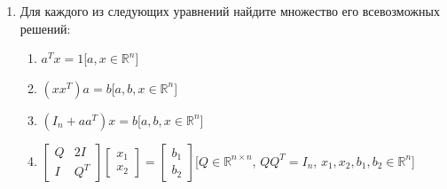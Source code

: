 \documentclass{article}
\newcommand{\R}{\mathbb{R}}
\begin{document}
\begin{enumerate}[label=\textbf{\arabic*}, leftmargin=0em]
\item Для каждого из следующих уравнений найдите множество его всевозможных решений:
\begin{enumerate}
\item $a^T x = 1$\hfill[$a, x \in \R^n$]
\item $(x x^T)a = b$\hfill[$a, b, x \in \R^n$]
\item $(I_n + a a^T)x = b$\hfill[$a, b, x \in \R^n$]
\item $\left[
\begin{array}{cc}
Q & 2I \\
I & Q^T
\end{array}
\right]
\left[
\begin{array}{c}
x_1\\
x_2
\end{array}
\right]
=
\left[
\begin{array}{c}
b_1\\
b_2
\end{array}
\right]
$\hfill[$Q \in \R^{n \times n}$, $Q Q^T = I_n$, $x_1, x_2, b_1, b_2 \in \R^n$]
\end{enumerate}

\end{enumerate}
\end{document}
